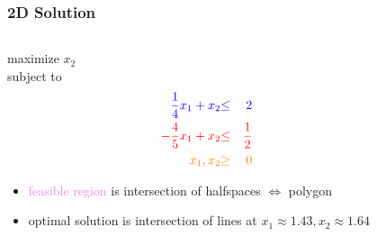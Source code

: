 \documentclass{beamer}
\begin{document}
\begin{frame} \frametitle{2D Solution}
  \begin{columns}
    \begin{column}{0.4 \textwidth}
  maximize $x_2$ \\
  subject to
  \begin{eqnarray*}
    \textcolor{blue}{\frac{1}{4} x_1 + x_2} &\textcolor{blue}{\leq}& \textcolor{blue}{2} \\
    \textcolor{red}{-\frac{4}{5} x_1 + x_2} &\textcolor{red}{\leq}& \textcolor{red}{\frac{1}{2}} \\
    \textcolor{orange}{x_1, x_2} &\textcolor{orange}{\geq}& \textcolor{orange}{0}
  \end{eqnarray*}
  \begin{itemize}
    \item \textcolor{violet}{feasible region} is intersection of halfspaces
     $\Leftrightarrow$ polygon
    \item optimal solution is intersection of lines
      at $x_1 \approx 1.43, x_2 \approx 1.64$
  \end{itemize}
  \end{column}
  \begin{column}{0.6 \textwidth}
    \begin{center}
  \end{center}
\end{column}
\end{columns}
\end{frame}
\end{document}
